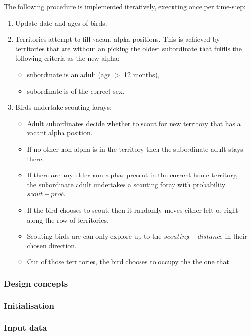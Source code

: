 The following procedure is implemented iteratively, executing once per time-step:
\begin{enumerate}
    \item Update date and ages of birds.
    \item Territories attempt to fill vacant alpha positions. This is achieved by territories that are without an picking the oldest subordinate that fulfils the following criteria as the new alpha:
    \begin{itemize}
        \item subordinate is an adult (age $>$ 12 months),
        \item subordinate is of the correct sex.
    \end{itemize}
    \item Birds undertake scouting forays:
    \begin{itemize}
        \item Adult subordinates decide whether to scout for new territory that has a vacant alpha position.
        \item If no other non-alpha is in the territory then the subordinate adult stays there.
        \item  If there are any older non-alphas present in the current home territory, the subordinate adult undertakes a scouting foray with probability $scout-prob$.
        \item If the bird chooses to scout, then it randomly moves either left or right along the row of territories.
        \item Scouting birds are can only explore up to the $scouting-distance$ in their chosen direction.
        \item Out of those territories, the bird chooses to occupy the the one that  
    \end{itemize}
\end{enumerate}

\subsubsection{Design concepts}
\label{thiele:intro:example:design}

\subsubsection{Initialisation}
\label{thiele:intro:example:intial}

\subsubsection{Input data}
\label{thiele:intro:example:input}

